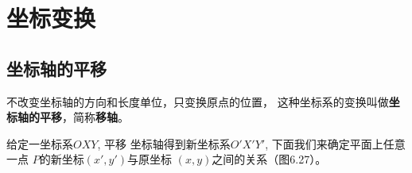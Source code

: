 \section{坐标变换}
\subsection{坐标轴的平移}
不改变坐标轴的方向和长度单位，只变换原点的位置，
这种坐标系的变换叫做\textbf{坐标轴的平移}，简称\textbf{移轴}。

给定一坐标系$OXY$, 平移
坐标轴得到新坐标系$O'X'Y'$, 
下面我们来确定平面上任意一点
$P$的新坐标$(x',y')$与原坐标
$(x,y)$之间的关系（图6.27）。















































































